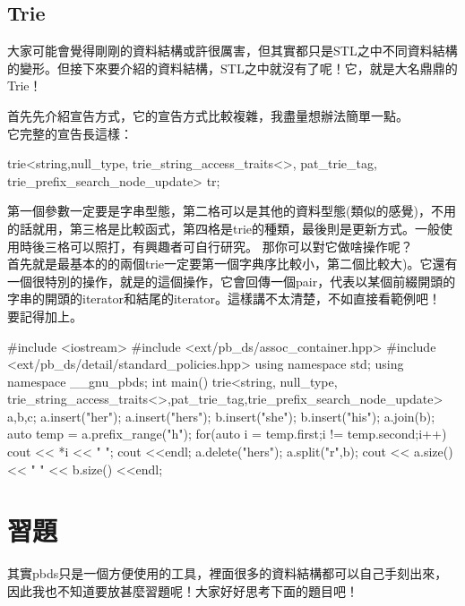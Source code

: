 \subsection{Trie}
大家可能會覺得剛剛的資料結構或許很厲害，但其實都只是STL之中不同資料結構的變形。但接下來要介紹的資料結構，STL之中就沒有了呢！它，就是大名鼎鼎的Trie！

首先先介紹宣告方式，它的宣告方式比較複雜，我盡量想辦法簡單一點。\\
它完整的宣告長這樣：
\begin{C++}
trie<string,null_type, trie_string_access_traits<>, pat_trie_tag, trie_prefix_search_node_update> tr;
\end{C++}
第一個參數一定要是字串型態，第二格可以是其他的資料型態(類似的感覺)，不用的話就用，第三格是比較函式，第四格是trie的種類，最後則是更新方式。一般使用時後三格可以照打，有興趣者可自行研究。
那你可以對它做啥操作呢？\\
首先就是最基本的的兩個trie一定要第一個字典序比較小，第二個比較大)。它還有一個很特別的操作，就是的這個操作，它會回傳一個pair，代表以某個前綴開頭的字串的開頭的iterator和結尾的iterator。這樣講不太清楚，不如直接看範例吧！\\
要記得加上。\\
\begin{C++}
#include <iostream>
#include <ext/pb_ds/assoc_container.hpp>
#include <ext/pb_ds/detail/standard_policies.hpp>
using namespace std;
using namespace __gnu_pbds;
int main()
{
  trie<string, null_type, trie_string_access_traits<>,pat_trie_tag,trie_prefix_search_node_update> a,b,c;
  a.insert("her");
  a.insert("hers");
  b.insert("she");
  b.insert("his");
  a.join(b);
  auto temp = a.prefix_range("h");
  for(auto i = temp.first;i != temp.second;i++)
  {
    cout << *i << " ";
  }
  cout <<endl;
  a.delete("hers");
  a.split("r",b);
  cout << a.size() << " " << b.size() <<endl;
}
\end{C++}
\section{習題}
其實pbds只是一個方便使用的工具，裡面很多的資料結構都可以自己手刻出來，因此我也不知道要放甚麼習題呢！大家好好思考下面的題目吧！
